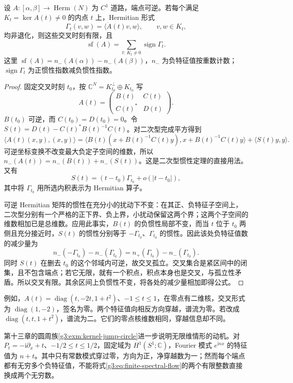 \begin{proposition}\label{g3:prop:spectral-crossing-finite}
	设 \(A:[\alpha,\beta]\to\operatorname{Herm}(N)\) 为 \(C^1\) 道路，端点可逆。若每个满足 \(K_t=\ker A(t)\ne0\) 的内点 \(t\) 上，Hermitian 形式
	\[
		\Gamma_t(v,w)=\langle\dot A(t)v,w\rangle,\qquad v,w\in K_t,
	\]
	均非退化，则这些交叉时刻有限，且
	\[
		\operatorname{sf}(A)=\sum_{t:\,K_t\ne0}\operatorname{sign}\Gamma_t.
	\]
	这里 \(\operatorname{sf}(A)=n_-(A(\alpha))-n_-(A(\beta))\)，\(n_-\) 为负特征值按重数计数；\(\operatorname{sign}\Gamma_t\) 为正惯性指数减负惯性指数。
\end{proposition}
\begin{proof}
	固定交叉时刻 \(t_0\)，按 \(\mathbb C^N=K_{t_0}^\perp\oplus K_{t_0}\) 写
	\[
		A(t)=\begin{pmatrix}B(t)&C(t)\\ C(t)^*&D(t)\end{pmatrix}.
	\]
	\(B(t_0)\) 可逆，而 \(C(t_0)=D(t_0)=0\)。令
	\(S(t)=D(t)-C(t)^*B(t)^{-1}C(t)\)。对二次型完成平方得到
	\[
		\langle A(t)(x,y),(x,y)\rangle
		=\langle B(t)(x+B(t)^{-1}C(t)y),x+B(t)^{-1}C(t)y\rangle
		+\langle S(t)y,y\rangle.
	\]
	可逆坐标变换不改变最大负定子空间的维数，所以
	\(n_-(A(t))=n_-(B(t))+n_-(S(t))\)。这是二次型惯性定理的直接用法。又有
	\[
		S(t)=(t-t_0)\Gamma_{t_0}+o(|t-t_0|),
	\]
	其中将 \(\Gamma_{t_0}\) 用所选内积表示为 Hermitian 算子。

	可逆 Hermitian 矩阵的惯性在充分小的扰动下不变：在其正、负特征子空间上，二次型分别有一个严格的正下界、负上界，小扰动保留这两个界；这两个子空间的维数相加已是总维数。应用此事实，\(B(t)\) 的负惯性局部不变，而当 \(t\) 位于 \(t_0\) 两侧且充分接近时，\(S(t)\) 的惯性分别等于 \(-\Gamma_{t_0}\)、\(\Gamma_{t_0}\) 的惯性。因此该处负特征值数的减少量为
	\[
		n_-(-\Gamma_{t_0})-n_-(\Gamma_{t_0})
		=n_+(\Gamma_{t_0})-n_-(\Gamma_{t_0}).
	\]
	同时 \(S(t)\) 在删去 \(t_0\) 的这个邻域内可逆，故交叉孤立。交叉集合是紧区间中的闭集，且不包含端点；若它无限，就有一个积点，积点本身也是交叉，与孤立性矛盾。所以交叉有限。其余区间上负惯性不变，将各处的减少量相加即得公式。
\end{proof}

例如，\(A(t)=\operatorname{diag}(t,-2t,1+t^2)\)、\(-1\le t\le1\)，在零点有二维核，交叉形式为 \(\operatorname{diag}(1,-2)\)，签名为零。两个特征值向相反方向穿越，谱流为零。若改成 \(\operatorname{diag}(t,t,1+t^2)\)，谱流为二。它们的零点核维数相同，穿越信息却不同。

\ProseParagraphBreak

第十三章的圆周族\cref{g3:exm:kernel-jump-circle}进一步说明无限维情形的动机。对 \(P_t=-\mathrm i\partial_x+t\)、\(-1/2\le t\le1/2\)，固定域为 \(H^1(S^1;\mathbb C)\)，Fourier 模式 \(e^{\mathrm inx}\) 的特征值为 \(n+t\)。其中只有常数模式穿过零，方向为正，净穿越数为一；然而每个端点都有无穷多个负特征值，不能将式\eqref{g3:eq:finite-spectral-flow}的两个有限整数直接换成两个无穷数。

